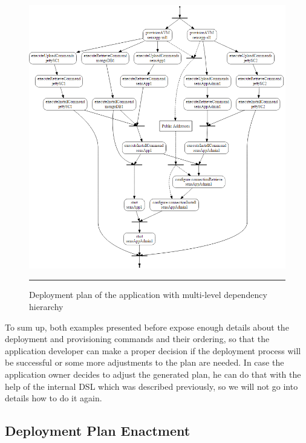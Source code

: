 \noindent 

\begin{figure}[htbp]
	\centering
		\includegraphics[width=38em]{./Figures/Sensapp_noSaas}
		\rule{38em}{0.5pt}
	\caption[Multi-level Hierarchy Plan]{Deployment plan of the application with multi-level dependency hierarchy}
	\label{fig:hierarchy_plan}
\end{figure}

\noindent 

\noindent To sum up, both examples presented before expose enough details about the deployment and provisioning commands and their ordering, so that the application developer can make a proper decision if the deployment process will be successful or some more adjustments to the plan are needed. In case the application owner decides to adjust the generated plan, he can do that with the help of the internal DSL which was described previously, so we will not go into details how to do it again.


\subsection{Deployment Plan Enactment}

